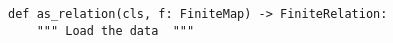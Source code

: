 \begin{verbatim}
def as_relation(cls, f: FiniteMap) -> FiniteRelation:
    """ Load the data  """
\end{verbatim}